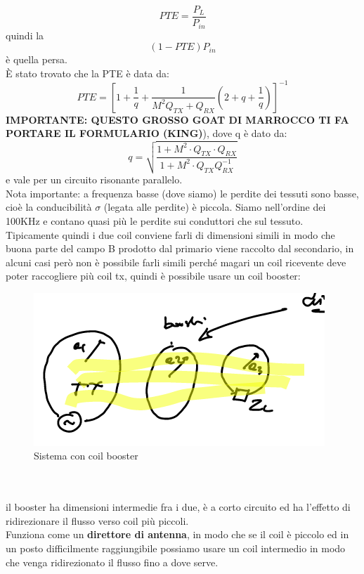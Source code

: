 \documentclass[oneside, 12pt]{extbook}
\begin{document}
\begin{equation}
PTE = \frac{P_L}{P_{in}}	
\end{equation}
quindi la 
\begin{equation}
	(1-PTE)P_{in}	
\end{equation}
è quella persa.\\È stato trovato che la PTE è data da:
\begin{equation}
	PTE = [1 + \frac{1}{q} + \dfrac{1}{M^2 Q_{TX} + Q_{RX}}(2 + q + \frac{1}{q})]^{-1}
\end{equation}
 \textbf{IMPORTANTE: QUESTO GROSSO GOAT DI MARROCCO TI FA PORTARE IL FORMULARIO (KING)}), dove q è dato da:
\begin{equation}
	q = \sqrt{\dfrac{1 + M^2\cdot Q_{TX}\cdot Q_{RX}}{1 + M^2 \cdot Q_{TX} Q_{RX}^{-1}}}
\end{equation}
e vale per un circuito risonante parallelo.\\Nota importante: a frequenza basse (dove siamo) le perdite dei tessuti sono basse, cioè la conducibilità $\sigma$ (legata alle perdite) è piccola. Siamo nell'ordine dei 100KHz e contano quasi più le perdite sui conduttori che sul tessuto.\\Tipicamente quindi i due coil conviene farli di dimensioni simili in modo che buona parte del campo B prodotto dal primario viene raccolto dal secondario, in alcuni casi però non è possibile farli simili perché magari un coil ricevente deve poter raccogliere più coil tx, quindi è possibile usare un coil booster:\\
\begin{figure}
	\includegraphics[scale=0.6]{immagini/booster_coil.png}
	\caption{Sistema con coil booster}
\end{figure}
\\\\
il booster ha dimensioni intermedie fra i due, è a corto circuito ed ha l'effetto di ridirezionare il flusso verso coil più piccoli.\\Funziona come un \textbf{direttore di antenna}, in modo che se il coil è piccolo ed in un posto difficilmente raggiungibile possiamo usare un coil intermedio in modo che venga ridirezionato il flusso fino a dove serve.
\end{document}

